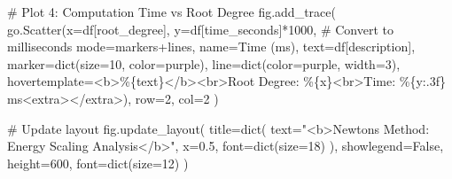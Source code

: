 \documentclass[
  letterpaper,
  DIV=11,
  numbers=noendperiod]{scrartcl}
\newenvironment{Shaded}{\begin{snugshade}}{\end{snugshade}}
\newcommand{\BuiltInTok}[1]{\textcolor[rgb]{0.00,0.23,0.31}{#1}}
\newcommand{\CommentTok}[1]{\textcolor[rgb]{0.37,0.37,0.37}{#1}}
\newcommand{\DecValTok}[1]{\textcolor[rgb]{0.68,0.00,0.00}{#1}}
\newcommand{\FloatTok}[1]{\textcolor[rgb]{0.68,0.00,0.00}{#1}}
\newcommand{\NormalTok}[1]{\textcolor[rgb]{0.00,0.23,0.31}{#1}}
\newcommand{\OperatorTok}[1]{\textcolor[rgb]{0.37,0.37,0.37}{#1}}
\newcommand{\SpecialCharTok}[1]{\textcolor[rgb]{0.37,0.37,0.37}{#1}}
\newcommand{\StringTok}[1]{\textcolor[rgb]{0.13,0.47,0.30}{#1}}
\newcommand{\VariableTok}[1]{\textcolor[rgb]{0.07,0.07,0.07}{#1}}
\begin{document}
\begin{Shaded}
\begin{Highlighting}[]
\CommentTok{\# Plot 4: Computation Time vs Root Degree}
\NormalTok{fig.add\_trace(}
\NormalTok{    go.Scatter(x}\OperatorTok{=}\NormalTok{df[}\StringTok{\textquotesingle{}root\_degree\textquotesingle{}}\NormalTok{], y}\OperatorTok{=}\NormalTok{df[}\StringTok{\textquotesingle{}time\_seconds\textquotesingle{}}\NormalTok{]}\OperatorTok{*}\DecValTok{1000}\NormalTok{,  }\CommentTok{\# Convert to milliseconds}
\NormalTok{               mode}\OperatorTok{=}\StringTok{\textquotesingle{}markers+lines\textquotesingle{}}\NormalTok{,}
\NormalTok{               name}\OperatorTok{=}\StringTok{\textquotesingle{}Time (ms)\textquotesingle{}}\NormalTok{,}
\NormalTok{               text}\OperatorTok{=}\NormalTok{df[}\StringTok{\textquotesingle{}description\textquotesingle{}}\NormalTok{],}
\NormalTok{               marker}\OperatorTok{=}\BuiltInTok{dict}\NormalTok{(size}\OperatorTok{=}\DecValTok{10}\NormalTok{, color}\OperatorTok{=}\StringTok{\textquotesingle{}purple\textquotesingle{}}\NormalTok{),}
\NormalTok{               line}\OperatorTok{=}\BuiltInTok{dict}\NormalTok{(color}\OperatorTok{=}\StringTok{\textquotesingle{}purple\textquotesingle{}}\NormalTok{, width}\OperatorTok{=}\DecValTok{3}\NormalTok{),}
\NormalTok{               hovertemplate}\OperatorTok{=}\StringTok{\textquotesingle{}\textless{}b\textgreater{}\%}\SpecialCharTok{\{text\}}\StringTok{\textless{}/b\textgreater{}\textless{}br\textgreater{}Root Degree: \%}\SpecialCharTok{\{x\}}\StringTok{\textless{}br\textgreater{}Time: \%}\SpecialCharTok{\{y:.3f\}}\StringTok{ ms\textless{}extra\textgreater{}\textless{}/extra\textgreater{}\textquotesingle{}}\NormalTok{),}
\NormalTok{    row}\OperatorTok{=}\DecValTok{2}\NormalTok{, col}\OperatorTok{=}\DecValTok{2}
\NormalTok{)}

\CommentTok{\# Update layout}
\NormalTok{fig.update\_layout(}
\NormalTok{    title}\OperatorTok{=}\BuiltInTok{dict}\NormalTok{(}
\NormalTok{        text}\OperatorTok{=}\StringTok{"\textless{}b\textgreater{}Newton\textquotesingle{}s Method: Energy Scaling Analysis\textless{}/b\textgreater{}"}\NormalTok{,}
\NormalTok{        x}\OperatorTok{=}\FloatTok{0.5}\NormalTok{,}
\NormalTok{        font}\OperatorTok{=}\BuiltInTok{dict}\NormalTok{(size}\OperatorTok{=}\DecValTok{18}\NormalTok{)}
\NormalTok{    ),}
\NormalTok{    showlegend}\OperatorTok{=}\VariableTok{False}\NormalTok{,}
\NormalTok{    height}\OperatorTok{=}\DecValTok{600}\NormalTok{,}
\NormalTok{    font}\OperatorTok{=}\BuiltInTok{dict}\NormalTok{(size}\OperatorTok{=}\DecValTok{12}\NormalTok{)}
\NormalTok{)}


\end{Highlighting}
\end{Shaded}
\end{document}
